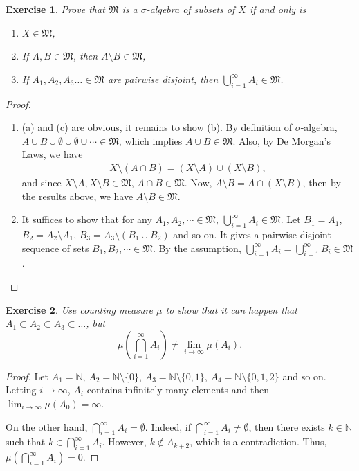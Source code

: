 \documentclass[11pt]{book}
\newtheorem{exercise}{Exercise}[section]
\theoremstyle{definition}
\numberwithin{equation}{chapter}
\def\MM{\mathfrak{M}}
\begin{document}
\begin{exercise}
Prove that $\MM$ is a $\sigma$-algebra of subsets of $X$ if and only is
\begin{enumerate}
    \item[(a)] $X\in\MM$,
    
    \item[(b)] If $A,B\in\MM$, then $A\setminus B\in \MM$,
    
    \item[(c)] If $A_1,A_2,A_3\ldots\in\MM$ are pairwise disjoint, then $\bigcup_{i=1}^\infty A_i\in\MM$.
\end{enumerate}
\end{exercise}
\begin{proof} 
~\begin{enumerate}
    \item[($\Rightarrow$)] (a) and (c) are obvious, it remains to show (b). By definition of $\sigma$-algebra, $A \cup B \cup \emptyset \cup \emptyset \cup \cdots \in \mathfrak{M}$, which implies $A \cup B \in \mathfrak{M}$. Also, by De Morgan's Laws, we have 
    \begin{align*}
        X \setminus (A \cap B) = (X \setminus A) \cup (X \setminus B),
    \end{align*}
    and since $X \setminus A, X \setminus B \in \mathfrak{M}$, $A \cap B \in \mathfrak{M}$. Now, $A \setminus B = A \cap (X \setminus B)$, then by the results above, we have $A \setminus B \in \mathfrak{M}$.
    
    \item[($\Leftarrow$)] It suffices to show that for any $A_1, A_2,\cdots \in \mathfrak{M}$, $\bigcup^\infty_{i=1}A_i \in \mathfrak{M}$. Let $B_1 = A_1$, $B_2 = A_2 \setminus A_1$, $B_3 = A_3 \setminus (B_1 \cup B_2)$ and so on. It gives a pairwise disjoint sequence of sets $B_1, B_2, \cdots \in \mathfrak{M}$. By the assumption, $\bigcup^\infty_{i=1}A_i = \bigcup^\infty_{i=1}B_i \in \mathfrak{M}$.
\end{enumerate}
\end{proof}

\medskip

\begin{exercise}
Use counting measure $\mu$ to show that it can happen that $A_1\subset A_2\subset A_3\subset\ldots$, but
$$
\mu\left(\bigcap_{i=1}^\infty A_i\right) \neq \lim_{i\to\infty}\mu(A_i).
$$
\end{exercise}
\begin{proof}
Let $A_1 = \mathbb{N}$, $A_2 = \mathbb{N} \setminus \{0\}$, $A_3 = \mathbb{N} \setminus \{0,1\}$, $A_4 = \mathbb{N} \setminus \{0,1,2\}$ and so on. Letting $i \to \infty$, $A_i$ contains infinitely many elements and then $\lim_{i\to\infty} \mu(A_0) = \infty$.

On the other hand, $\bigcap_{i=1}^\infty A_i = \emptyset$. Indeed, if $\bigcap_{i=1}^\infty A_i \neq \emptyset$, then there exists $k \in \mathbb{N}$ such that $k \in \bigcap_{i=1}^\infty A_i$. However, $k \notin A_{k+2}$, which is a contradiction. Thus, $\mu\left(\bigcap_{i=1}^\infty A_i\right) = 0$.
\end{proof}
\end{document}
